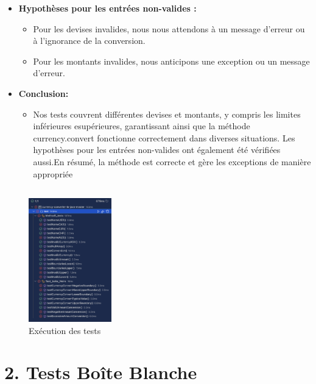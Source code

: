 \documentclass[letterpaper, 10pt]{article}
\begin{document}
\begin{itemize}
        
    \item \textbf{Hypothèses pour les entrées non-valides :}
        \begin{itemize}
            \item Pour les devises invalides, nous nous attendons à un message d'erreur ou à l'ignorance de la conversion.
            \item Pour les montants invalides, nous anticipons une exception ou un message d'erreur.
        \end{itemize}

     \item \textbf{Conclusion: }
     \begin{itemize}
         \item Nos tests couvrent différentes devises et montants, y compris les limites inférieures esupérieures, garantissant ainsi que la méthode currency.convert fonctionne correctement dans diverses situations. Les hypothèses pour les entrées non-valides ont également été vérifiées aussi.En résumé, la méthode est correcte et gère les exceptions de manière appropriée
     \end{itemize}
\end{itemize}

    \subsection*{}
    \begin{figure}
    \centering
    \includegraphics[width=0.32\textwidth]{tests.png}
    \caption{Exécution des tests}
    \end{figure}

\section*{2. Tests Boîte Blanche}
\end{document}
